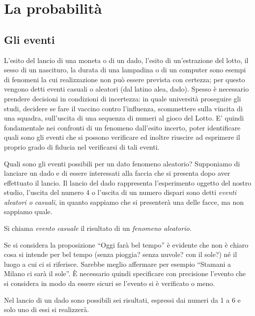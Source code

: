 \chapter{La probabilità}
\section{Gli eventi}
L’esito del lancio di una moneta o di un dado, l’esito di un'estrazione del lotto, il sesso di un nascituro, la durata di una lampadina o di un computer sono esempi di fenomeni la cui realizzazione non può essere prevista con certezza; per questo vengono detti eventi casuali o aleatori (dal latino alea, dado). Spesso è necessario prendere decisioni in condizioni di incertezza: in quale università proseguire gli studi, decidere se fare il vaccino contro l'influenza, scommettere sulla vincita di una squadra, sull'uscita di una sequenza di numeri al gioco del Lotto. E’ quindi fondamentale nei confronti di un fenomeno dall’esito incerto, poter identificare quali sono gli eventi che si possono verificare ed inoltre riuscire ad esprimere il proprio grado di fiducia nel verificarsi di tali eventi.

Quali sono gli eventi possibili per un dato fenomeno aleatorio? Supponiamo di lanciare un dado e di essere interessati alla faccia che si presenta dopo aver effettuato il lancio. Il lancio del dado rappresenta l'esperimento oggetto del nostro studio, l’uscita del numero 4 o l’uscita di un numero dispari sono detti \emph{eventi aleatori o casuali}, in quanto sappiamo che si presenterà una delle facce, ma non sappiamo quale.

\begin{definizione}
Si chiama \emph{evento casuale} il risultato di un \emph{fenomeno aleatorio}.
\end{definizione}

Se si considera la proposizione “Oggi farà bel tempo” è evidente che non è chiaro cosa si intende per bel tempo (senza pioggia? senza nuvole? con il sole?) né il luogo a cui ci si riferisce. Sarebbe meglio affermare per esempio “Stamani a Milano ci sarà il sole”. È necessario quindi specificare con precisione l'evento che si considera in modo da essere sicuri se l'evento si è verificato o meno.

Nel lancio di un dado sono possibili sei risultati, espressi dai numeri da 1 a 6 e solo uno di essi si realizzerà.

